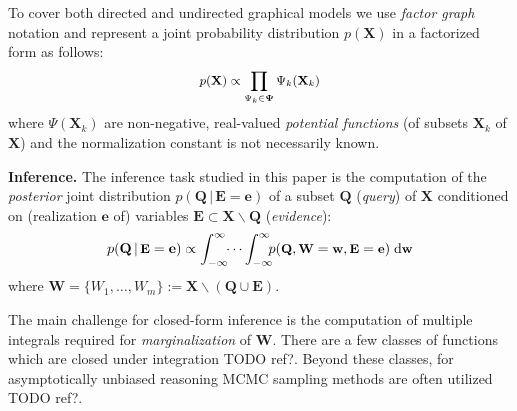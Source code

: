 \documentclass{article}
\renewcommand{\vec}[1]{\mathbf{#1}}
\newcommand{\bvec}[1]{\textbf{#1}}
\newcommand{\pr}{p}
\newcommand{\dd}{\;\mathrm{d}} %
\begin{document}
To cover both directed and undirected graphical models we use
\emph{factor graph} notation \cite{kschischang2001factor}
and represent a joint probability distribution $\pr(\vec{X})$ in a factorized form as follows: 
\begin{equation} \footnotesize
\label{e:factor-graph}
\pr(\vec{X}) \propto \prod_{\Psi_k \in \boldsymbol\Psi} \Psi_k (\vec{X}_k)
\end{equation}
where 
$\Psi(\vec{X}_k)$ are non-negative, real-valued \emph{potential functions} (of subsets $\bvec{X}_k$ of $\vec{X}$) and the normalization constant is not necessarily known.

\textbf{Inference.}
The inference task studied in this paper is 
the computation of the \emph{posterior} joint distribution 
$\pr(\bvec{Q} \,|\, \bvec{E}=\bvec{e})$
of 
a subset $\bvec{Q}$ (\emph{query}) of $\bvec{X}$ 
conditioned on (realization $\bvec{e}$ of) 
variables  
$\bvec{E} \subset\bvec{X} \backslash \bvec{Q}$ (\emph{evidence}):
\begin{equation}\vspace{-0.5mm}\footnotesize
\label{e:inference}
\pr(\vec{Q} \,|\, \bvec{E} =\vec{e}) \propto 
\int_{-\infty}^{\infty} \!\! \cdots \int_{-\infty}^{\infty}
\!\!\! \pr(\bvec{Q}, \bvec{W} = \bvec{w}, \bvec{E}=\bvec{e} )
 \dd \bvec{w}
\end{equation}
where $\bvec{W} = \{W_1, \ldots, W_m\} := \vec{X} \backslash (\vec{Q} \cup \vec{E})$.%

The main challenge for closed-form inference is the computation of multiple integrals required for \emph{marginalization} of $\bvec{W}$.
There are a few classes of functions which are closed under integration {\color{red}TODO ref?}.
Beyond these classes, for asymptotically unbiased reasoning MCMC sampling methods are often utilized {\color{red}TODO ref?}.  

\end{document}
